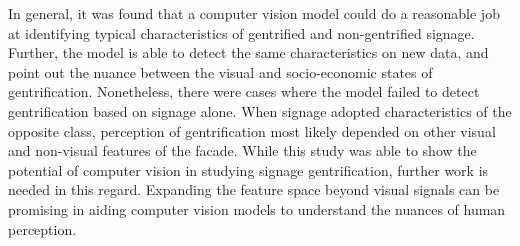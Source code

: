 In general, it was found that a computer vision model could do a reasonable job at identifying typical characteristics of gentrified and non-gentrified signage. Further, the model is able to detect the same characteristics on new data, and point out the nuance between the visual and socio-economic states of gentrification. Nonetheless, there were cases where the model failed to detect gentrification based on signage alone. When signage adopted characteristics of the opposite class, perception of gentrification most likely depended on other visual and non-visual features of the facade. While this study was able to show the potential of computer vision in studying signage gentrification, further work is needed in this regard. Expanding the feature space beyond visual signals can be promising in aiding computer vision models to understand the nuances of human perception.